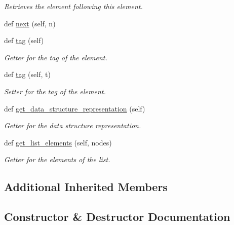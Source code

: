 \begin{DoxyCompactItemize}
\begin{DoxyCompactList}\small\item\em Retrieves the element following this element. \end{DoxyCompactList}\item 
def \mbox{\hyperlink{classbridges_1_1ml__element_1_1_m_lelement_a588b700bb42eb43ce3993f9715497deb}{next}} (self, n)
\item 
def \mbox{\hyperlink{classbridges_1_1ml__element_1_1_m_lelement_a805f6b6f24ec9c5518c298320742a8d6}{tag}} (self)
\begin{DoxyCompactList}\small\item\em Getter for the tag of the element. \end{DoxyCompactList}\item 
def \mbox{\hyperlink{classbridges_1_1ml__element_1_1_m_lelement_aaae13135b666038dee8a843cd32b03b1}{tag}} (self, t)
\begin{DoxyCompactList}\small\item\em Setter for the tag of the element. \end{DoxyCompactList}\item 
def \mbox{\hyperlink{classbridges_1_1ml__element_1_1_m_lelement_a7d176b966746a889f9234d4a76b99c0c}{get\+\_\+data\+\_\+structure\+\_\+representation}} (self)
\begin{DoxyCompactList}\small\item\em Getter for the data structure representation. \end{DoxyCompactList}\item 
def \mbox{\hyperlink{classbridges_1_1ml__element_1_1_m_lelement_a3996cd2cec7c3978437392eba2ef66eb}{get\+\_\+list\+\_\+elements}} (self, nodes)
\begin{DoxyCompactList}\small\item\em Getter for the elements of the list. \end{DoxyCompactList}\end{DoxyCompactItemize}
\subsection*{Additional Inherited Members}


\subsection{Constructor \& Destructor Documentation}
\mbox{\label{classbridges_1_1ml__element_1_1_m_lelement_ae0242b9e3f2d7d7ccc702ef0bc7a61ba}} 

